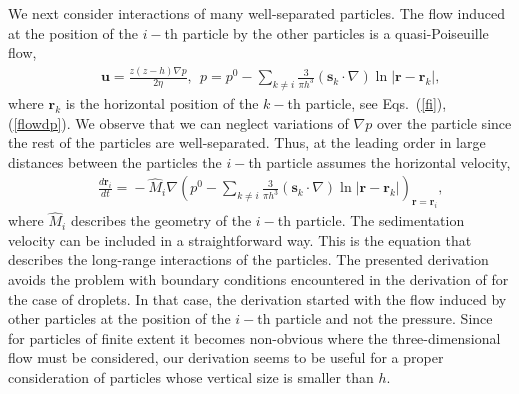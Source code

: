 We next consider interactions of many well-separated particles. The flow induced at the position of the $i-$th particle by the other particles is a quasi-Poiseuille flow,
\begin{eqnarray}&&\!\!\!\!\!\!\!\!\!\!
\bm u\!=\!\frac{z(z\!-\!h)\nabla p}{2\eta},\ \ p\!=\!p^0\!-\!\sum_{k\neq i} \frac{3}{\pi h^3}\!(\bm s_k\cdot\nabla) \ln |\bm r\!-\!\bm r_k|,
\end{eqnarray}
where $\bm r_k$ is the horizontal position of the $k-$th particle, see Eqs.~(\ref{fi}), (\ref{flowdp}). We observe that we can neglect variations of $\nabla p$ over the particle since  the rest of the particles are well-separated. Thus, at the leading order in large distances between the particles the $i-$th particle assumes the horizontal velocity,
\begin{eqnarray}&&\!\!\!\!\!\!\!\!\!\!
\frac{d\bm r_i}{dt}%
\!=\!-{\hat M}_i\nabla\left( p^0\!-\!\sum_{k\neq i} \frac{3}{\pi h^3}\!(\bm s_k\cdot\nabla) \ln |\bm r\!-\!\bm r_k|\right)_{\bm r=\bm r_i}, \label{inhetractio}
\end{eqnarray}
where ${\hat M}_i$ describes the geometry of the $i-$th particle. The sedimentation velocity can be included in a straightforward way. This is the equation that describes the long-range interactions of the particles. The presented derivation avoids the problem with boundary conditions encountered in the derivation of \cite{tl2014} for the case of droplets. In that case, the derivation started with the flow induced by other particles at the position of the $i-$th particle and not the pressure. Since for particles of finite extent it becomes non-obvious where the three-dimensional flow must be considered, our derivation seems to be useful for a proper consideration of particles whose vertical size is smaller than $h$.

